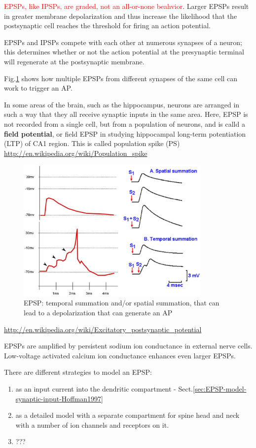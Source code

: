   
\textcolor{red}{EPSPs, like IPSPs, are graded, not an all-or-none beahvior}.
Larger EPSPs result in greater membrane depolarization and thus increase the
likelihood that the postsynaptic cell reaches the threshold for firing an action potential.

EPSPs and IPSPs compete with each other at numerous synapses of a neuron; this
determines whether or not the action potential at the presynaptic terminal will
regenerate at the postsynaptic membrane.


Fig.\ref{fig:EPSP_summation} shows how multiple EPSPs from different synapses
of the same cell can work to trigger an AP. 

In some areas of the brain, such as the hippocampus, neurons are arranged in
such a way that they all receive synaptic inputs in the same area. Here, EPSP is
not recorded from a single cell, but from a population of neurons, and is calld
a {\bf field potential}, or field EPSP in studying hippocampal long-term
potentiation (LTP) of CA1 region. This is called population spike (PS)
\url{http://en.wikipedia.org/wiki/Population_spike}

\begin{figure}[hbt]
  \centerline{\includegraphics[height=7cm,
    angle=0]{./images/EPSP_summation.eps}}
  \caption{EPSP: temporal summation and/or spatial summation, that can lead to
  a depolarization that can generate an AP}
\label{fig:EPSP_summation}
\end{figure}
\url{http://en.wikipedia.org/wiki/Excitatory_postsynaptic_potential}

EPSPs are amplified by persistent sodium ion conductance in external nerve
cells. Low-voltage activated calcium ion conductance enhances even larger EPSPs.


There are different strategies to model an EPSP:
\begin{enumerate}
  \item as an input current into the dendritic compartment - Sect.\ref{sec:EPSP-model-synaptic-input-Hoffman1997}
  
  \item as a detailed model with a separate compartment for spine head and neck
  with a number of ion channels and receptors on it.
  
  \item ???
\end{enumerate}

